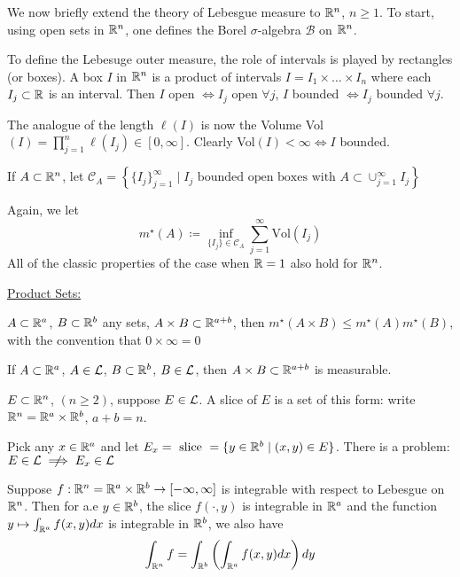 We now briefly extend the theory of Lebesgue measure to $\mathbb{R}^n$, $n \geq 1$.
To start, using open sets in $\mathbb{R}^n$, one defines the Borel $\sigma$-algebra $\mathcal{B}$ on $\mathbb{R}^n$.

To define the Lebesuge outer measure, the role of intervals is played by rectangles (or boxes).
A box $I$ in $\mathbb{R}^{n}$ is a product of intervals $I = I_1 \times \hdots \times I_n$ where each $I_j \subset \mathbb{R}$ is an interval.
Then $I$ open $\iff I_j$ open $\forall j$, $I$ bounded $\iff I_j$ bounded $\forall j$.

The analogue of the length $\ell (I)$ is now the Volume Vol$(I) = \prod_{j=1}^{n} \ell (I_j) \in [0,\infty]$.
Clearly Vol$(I) < \infty \iff I$ bounded.

If $A \subset \mathbb{R}^n$, let $\mathcal{C}_A = \left\{ \{ I_j\}_{j=1}^{\infty} \mid I_j \text{ bounded open boxes with } A \subset \cup_{j=1}^{\infty} I_j  \right\}$

Again, we let
\[
    m^{\star} (A) \coloneqq \inf_{\{ I_j \} \in \mathcal{C}_A } \sum_{j=1}^{\infty} \text{Vol}(I_j)
\]
All of the classic properties of the case when $\mathbb{R} = 1$ also hold for $\mathbb{R}^n$.

\underline{Product Sets:}

\begin{lemma}
    $A \subset \mathbb{R}^a$, $B \subset \mathbb{R}^b$ any sets, $A \times B \subset \mathbb{R}^{a+b}$, then $m^{\star}(A \times B) \leq m^{\star} (A) m^{\star}(B)$, with the convention that $0 \times \infty = 0$
\end{lemma}

\begin{prop}
    If $A \subset \mathbb{R}^{a}$, $A \in \mathcal{L}$, $B \subset \mathbb{R}^b$, $B \in \mathcal{L}$, then $A \times B \subset \mathbb{R}^{a+b}$ is measurable.
\end{prop}

\begin{definition}[Slices]
    $E \subset \mathbb{R}^n$, $(n \geq 2)$, suppose $E \in \mathcal{L}$.
    A slice of $E$ is a set of this form: write $\mathbb{R}^n = \mathbb{R}^a \times \mathbb{R}^b$, $a+b = n$.
\end{definition}

Pick any $x \in \mathbb{R}^{a}$ and let $E_x = \text{ slice } = \{ y \in \mathbb{R}^{b} \mid (x,y) \in E \}$.
There is a problem: $E \in \Le \centernot\implies E_x \in \Le$

\begin{theorem}
    Suppose $f: \mathbb{R}^n = \mathbb{R}^a \times \mathbb{R}^b \rightarrow [-\infty, \infty]$ is integrable with respect to Lebesgue on $\mathbb{R}^n$.
    Then for a.e $y \in \mathbb{R}^b$, the slice $f(\cdot, y)$ is integrable in $\mathbb{R}^a$ and the function $y \mapsto \int_{\mathbb{R}^a} f(x,y)dx$ is integrable in $\mathbb{R}^b$, we also have
    \[
        \int_{\mathbb{R}^n} f = \int_{\mathbb{R}^b} \left( \int_{\mathbb{R}^a} f(x,y)dx \right)dy
    \]
\end{theorem}

